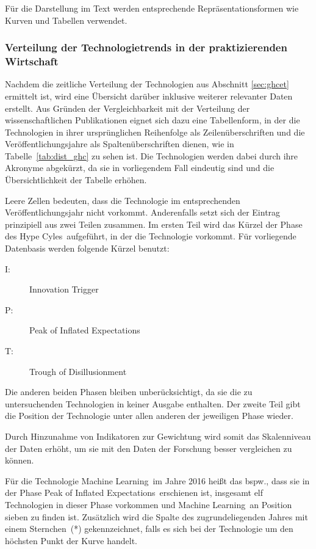 Für die Darstellung im Text werden entsprechende Repräsentationsformen wie Kurven und Tabellen verwendet.

\subsubsection{Verteilung der Technologietrends in der praktizierenden Wirtschaft}
Nachdem die zeitliche Verteilung der Technologien aus Abschnitt \ref{sec:ghcet} ermittelt ist, wird eine Übersicht darüber inklusive weiterer relevanter Daten erstellt. Aus Gründen der Vergleichbarkeit mit der Verteilung der wissenschaftlichen Publikationen eignet sich dazu eine Tabellenform, in der die Technologien in ihrer ursprünglichen Reihenfolge als Zeilenüberschriften und die Veröffentlichungsjahre als Spaltenüberschriften dienen, wie in Tabelle~\ref{tab:dist_ghc} zu sehen ist. Die Technologien werden dabei durch ihre Akronyme abgekürzt, da sie in vorliegendem Fall eindeutig sind und die Übersichtlichkeit der Tabelle erhöhen.

Leere Zellen bedeuten, dass die Technologie im entsprechenden Veröffentlichungsjahr nicht vorkommt. Anderenfalls setzt sich der Eintrag prinzipiell aus zwei Teilen zusammen. Im ersten Teil wird das Kürzel der Phase des \glqq Hype Cyles\grqq~aufgeführt, in der die Technologie vorkommt. Für vorliegende Datenbasis werden folgende Kürzel benutzt:

\begin{description}
	\item[I:] Innovation Trigger
	\item[P:] Peak of Inflated Expectations
	\item[T:] Trough of Disillusionment
\end{description}

Die anderen beiden Phasen bleiben unberücksichtigt, da sie die zu untersuchenden Technologien in keiner Ausgabe enthalten. Der zweite Teil gibt die Position der Technologie unter allen anderen der jeweiligen Phase wieder.

Durch Hinzunahme von Indikatoren zur Gewichtung wird somit das Skalenniveau der Daten erhöht, um sie mit den Daten der Forschung besser vergleichen zu können.

Für die Technologie \glqq Machine Learning\grqq~im Jahre 2016 heißt das bspw., dass sie in der Phase \glqq Peak of Inflated Expectations\grqq~erschienen ist, insgesamt elf Technologien in dieser Phase vorkommen und \glqq Machine Learning\grqq~an Position sieben zu finden ist. Zusätzlich wird die Spalte des zugrundeliegenden Jahres mit einem Sternchen~(*) gekennzeichnet, falls es sich bei der Technologie um den höchsten Punkt der Kurve handelt.

